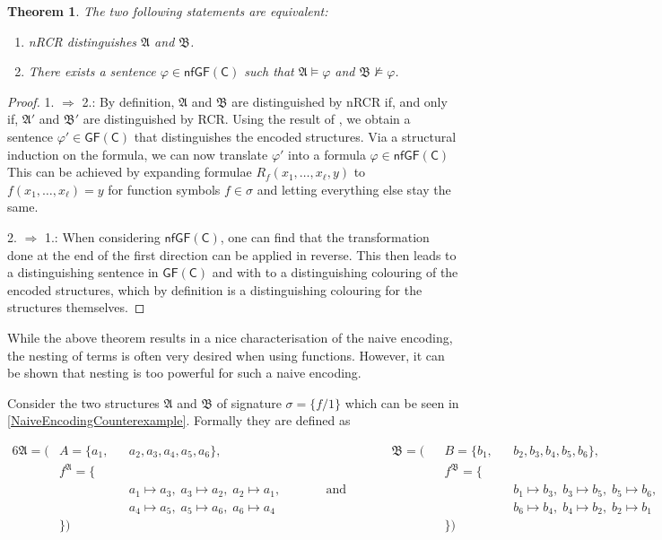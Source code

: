 \documentclass[a4paper,11pt,DIV=15]{scrartcl} %
\renewcommand{\phi}{\varphi}
\theoremstyle{plain}
\newtheorem{theorem}{Theorem}
\theoremstyle{definition}
\newcommand{\GFC}{\mathsf{GF}(\mathsf{C})}
\begin{document}
\begin{theorem}
	The two following statements are equivalent:
	\begin{enumerate}
		\item nRCR distinguishes $\mathfrak A$ and $\mathfrak B$.
		\item There exists a sentence $\phi\in \mathsf{nfGF}(\mathsf C)$ such that $\mathfrak A\models \phi$ and $\mathfrak B\not\models \phi$.
	\end{enumerate}
\end{theorem}
\begin{proof}
	1. $\Rightarrow$ 2.:
	By definition, $\mathfrak A$ and $\mathfrak B$ are distinguished by nRCR if, and only if, $\mathfrak A'$ and $\mathfrak B'$ are distinguished by RCR.
	Using the result of \cite{scheidt2025ColorRefinement}, we obtain a sentence $\varphi'\in\GFC$ that distinguishes the encoded structures.
	Via a structural induction on the formula, we can now translate $\varphi'$ into a formula $\phi\in \mathsf{nfGF}(\mathsf C)$
	This can be achieved by expanding formulae $R_f(x_1,\dots,x_\ell,y)$ to $f(x_1,\dots,x_\ell)=y$ for function symbols $f\in\sigma$ and letting everything else stay the same.
	
	2. $\Rightarrow$ 1.:
	When considering $\mathsf{nfGF}(\mathsf C)$, one can find that the transformation done at the end of the first direction can be applied in reverse.
	This then leads to a distinguishing sentence in $\GFC$ and with \cite{scheidt2025ColorRefinement} to a distinguishing colouring of the encoded structures, which by definition is a distinguishing colouring for the structures themselves.
\end{proof}

While the above theorem results in a nice characterisation of the naive encoding, the nesting of terms is often very desired when using functions.
However, it can be shown that nesting is too powerful for such a naive encoding.

Consider the two structures $\mathfrak A$ and $\mathfrak B$ of signature $\sigma=\{f/1\}$ which can be seen in \cref{NaiveEncodingCounterexample}.
Formally they are defined as

\begin{alignat*}{6}
	\mathfrak A = (&A=\{a_1, &&a_2, a_3, a_4, a_5, a_6\}, && && \mathfrak B = (&&B=\{b_1, &&b_2, b_3, b_4, b_5, b_6\}, \\ 
	& f^{\mathfrak A} = \{&& && && && f^{\mathfrak B} = \{&& \\
	& && a_1 \mapsto a_3,\; a_3 \mapsto a_2,\; a_2 \mapsto a_1, && \qquad \text{and}\qquad && && && b_1 \mapsto b_3,\; b_3 \mapsto b_5,\; b_5 \mapsto b_6, \\
	& && a_4 \mapsto a_5,\; a_5 \mapsto a_6,\; a_6 \mapsto a_4 && && && && b_6 \mapsto b_4,\; b_4 \mapsto b_2,\; b_2 \mapsto b_1 \\
	&\}) && && && && \}) &&
\end{alignat*}
\end{document}
